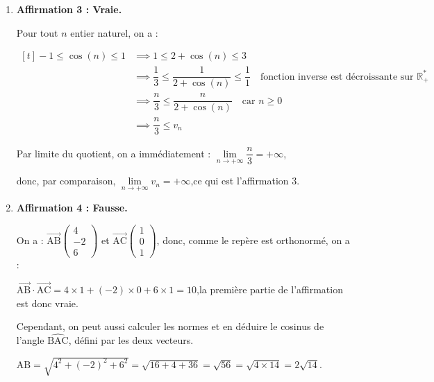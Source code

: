 \documentclass[10pt]{article}
\providecommand{\R}{\mathbb{R}}
\providecommand{\vect}[1]{\overrightarrow{#1}}
\providecommand{\np}[2][]{{#2~#1}}
\begin{document}
\begin{enumerate}
	Finalement, par principe multiplicatif, une équipe est un ensemble de trois filles choisi parmi les 816 ensembles possibles, associé à un ensemble de garçons parmi les 364 ensembles possibles : il y a donc $\quad816 \times 364 = \np{297024}$ équipes différentes possibles.

	\item \textbf{Affirmation 3 : Vraie.}

	Pour tout $n$ entier naturel, on a :

	$\begin{aligned}[t]
		-1 \leqslant \cos(n) \leqslant 1 &\implies 1\leqslant 2 + \cos(n) \leqslant 3\\
		&\implies \dfrac{1}{3} \leqslant \dfrac{1}{2+\cos(n)} \leqslant \dfrac{1}{1}\quad\text{fonction inverse est décroissante sur } \R_{+}^{*}\\
		&\implies \dfrac{n}{3} \leqslant \dfrac{n}{2 + \cos(n)}\quad \text{car } n\geqslant 0\\
		&\implies \dfrac{n}{3} \leqslant v_n
	\end{aligned}$

	Par limite du quotient, on a immédiatement : \quad$\lim\limits_{n \to +\infty} \dfrac{n}{3} = +\infty$,

	donc, par comparaison, \quad $\lim\limits_{n \to +\infty} v_n = +\infty$,\quad ce qui est l'affirmation 3.

	\item \textbf{Affirmation 4 : Fausse.}

	On a : $\vect{\mathrm{AB}}\begin{pmatrix}4\\-2\\6\end{pmatrix}$ et $\vect{\mathrm{AC}}\begin{pmatrix}1\\0\\1\end{pmatrix}$,
	donc, comme le repère est orthonormé, on a :

	$\vect{\mathrm{AB}}\cdot\vect{\mathrm{AC}} = 4\times 1 + (-2)\times 0 + 6 \times 1 = 10$,\quad la première partie de l'affirmation est donc vraie.

	Cependant, on peut aussi calculer les normes et en déduire le cosinus de l'angle $\widehat{\mathrm{BAC}}$, défini par les deux vecteurs.

	$\mathrm{AB} = \sqrt{4^2 + (-2)^2 + 6^2} = \sqrt{16 + 4 + 36} = \sqrt{56} = \sqrt{4 \times 14} = 2\sqrt{14}$.


\end{enumerate}
\end{document}
